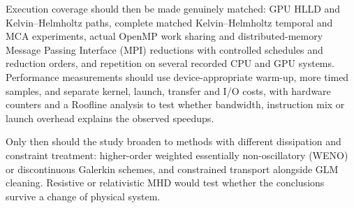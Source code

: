 Execution coverage should then be made genuinely matched: GPU HLLD and
Kelvin--Helmholtz paths, complete matched Kelvin--Helmholtz temporal and MCA
experiments, actual OpenMP work sharing and distributed-memory Message Passing
Interface (MPI) reductions with controlled schedules and reduction orders, and
repetition on several recorded CPU and GPU systems. Performance measurements
should use device-appropriate warm-up, more timed samples, and separate kernel,
launch, transfer and I/O costs, with hardware counters and a Roofline analysis
to test whether bandwidth, instruction mix or launch overhead explains the
observed speedups.

Only then should the study broaden to methods with different dissipation and
constraint treatment: higher-order weighted essentially non-oscillatory (WENO)
or discontinuous Galerkin schemes, and constrained transport alongside GLM
cleaning. Resistive or relativistic MHD would test whether the conclusions
survive a change of physical system.
